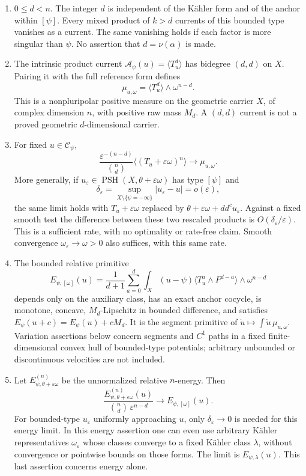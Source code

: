 \documentclass[
  10pt,
]{article}
\providecommand{\tightlist}{%
  \setlength{\itemsep}{0pt}\setlength{\parskip}{0pt}}
\begin{document}
\begin{enumerate}
\def\labelenumi{\arabic{enumi}.}
\tightlist
\item
  \(0\leq d<n\). The integer \(d\) is independent of the Kähler form and
  of the anchor within \([\psi]\). Every mixed product of \(k>d\)
  currents of this bounded type vanishes as a current. The same
  vanishing holds if each factor is more singular than \(\psi\). No
  assertion that \(d=\nu(\alpha)\) is made.
\item
  The intrinsic product current
  \(\mathcal A_\psi(u)=\langle T_u^d\rangle\) has bidegree \((d,d)\) on
  \(X\). Pairing it with the full reference form defines \[
  \mu_{u,\omega}=\langle T_u^d\rangle\wedge\omega^{n-d}.
  \] This is a nonpluripolar positive measure on the geometric carrier
  \(X\), of complex dimension \(n\), with positive raw mass \(M_d\). A
  \((d,d)\) current is not a proved geometric \(d\)-dimensional carrier.
\item
  For fixed \(u\in\mathcal C_\psi\), \[
  \frac{\varepsilon^{-(n-d)}}{\binom nd}\langle(T_u+\varepsilon\omega)^n\rangle\longrightarrow\mu_{u,\omega}.
  \] More generally, if
  \(u_\varepsilon\in\operatorname{PSH}(X,\theta+\varepsilon\omega)\) has
  type \([\psi]\) and \[
  \delta_\varepsilon=\sup_{X\setminus\{\psi=-\infty\}}|u_\varepsilon-u|=o(\varepsilon),
  \] the same limit holds with \(T_u+\varepsilon\omega\) replaced by
  \(\theta+\varepsilon\omega+dd^cu_\varepsilon\). Against a fixed smooth
  test the difference between these two rescaled products is
  \(O(\delta_\varepsilon/\varepsilon)\). This is a sufficient rate, with
  no optimality or rate-free claim. Smooth convergence
  \(\omega_\varepsilon\to\omega>0\) also suffices, with this same rate.
\item
  The bounded relative primitive \[
  E_{\psi,[\omega]}(u)=\frac1{d+1}\sum_{a=0}^d\int_X(u-\psi)\langle T_u^a\wedge P^{d-a}\rangle\wedge\omega^{n-d}
  \] depends only on the auxiliary class, has an exact anchor cocycle,
  is monotone, concave, \(M_d\)-Lipschitz in bounded difference, and
  satisfies \(E_\psi(u+c)=E_\psi(u)+cM_d\). It is the segment primitive
  of \(\dot u\mapsto\int\dot u\,\mu_{u,\omega}\). Variation assertions
  below concern segments and \(C^1\) paths in a fixed finite-dimensional
  convex hull of bounded-type potentials; arbitrary unbounded or
  discontinuous velocities are not included.
\item
  Let \(E^{(n)}_{\psi,\theta+\varepsilon\omega}\) be the unnormalized
  relative \(n\)-energy. Then \[
  \frac{E^{(n)}_{\psi,\theta+\varepsilon\omega}(u)}{\binom nd\,\varepsilon^{n-d}}\longrightarrow E_{\psi,[\omega]}(u).
  \] For bounded-type \(u_\varepsilon\) uniformly approaching \(u\),
  only \(\delta_\varepsilon\to0\) is needed for this energy limit. In
  this energy assertion one can even use arbitrary Kähler
  representatives \(\omega_\varepsilon\) whose classes converge to a
  fixed Kähler class \(\lambda\), without convergence or pointwise
  bounds on those forms. The limit is \(E_{\psi,\lambda}(u)\). This last
  assertion concerns energy alone.
\end{enumerate}
\end{document}
